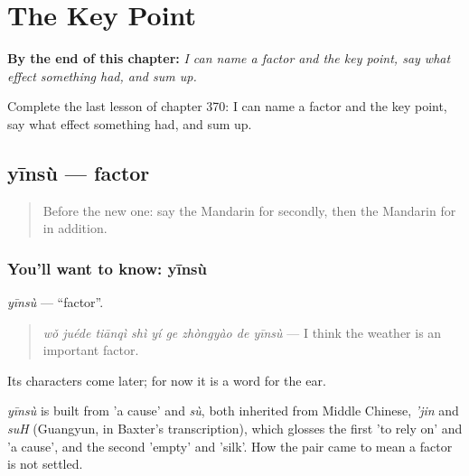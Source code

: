 
\chapter{The Key Point}
\label{ch:zh-the-key-point}

\begin{chapteropening}
\textbf{By the end of this chapter:} \emph{I can name a factor and the key point, say what effect something had, and sum up.}

Complete the last lesson of chapter 370: I can name a factor and the key point, say what effect something had, and sum up.
\end{chapteropening}

\section[yīnsù]{yīnsù — factor}

\label{lesson:ZH-C370-yinsu}



\begin{quote}
Before the new one: say the Mandarin for secondly, then the Mandarin for in addition.
\end{quote}

\subsection*{You'll want to know: yīnsù}
\emph{yīnsù} — \textquotedblleft{}factor\textquotedblright{}.

\begin{quote}
\emph{wǒ juéde tiānqì shì yí ge zhòngyào de yīnsù} — I think the weather is an important factor.
\end{quote}

Its characters come later; for now it is a word for the ear.

\begin{cousinweb}
\emph{yīnsù} is built from  'a cause' and \emph{sù}, both inherited from Middle Chinese, \emph{'jin} and \emph{suH} (Guangyun, in Baxter's transcription), which glosses the first 'to rely on' and 'a cause', and the second 'empty' and 'silk'. How the pair came to mean a factor is not settled.
\end{cousinweb}

